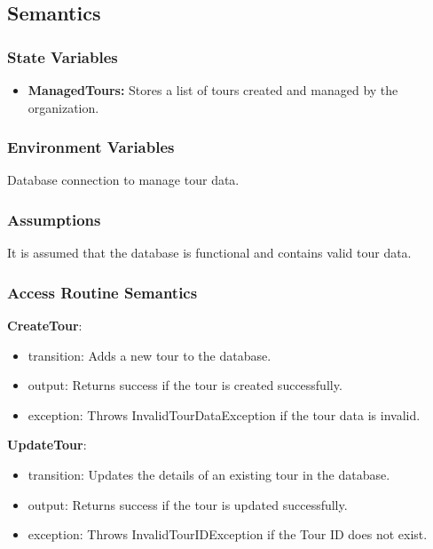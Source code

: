 \documentclass[12pt, titlepage]{article}
\begin{document}
\subsection{Semantics}

\subsubsection{State Variables}

\begin{itemize}
  \item \textbf{ManagedTours:} Stores a list of tours created and managed by the organization.
\end{itemize}

\subsubsection{Environment Variables}

Database connection to manage tour data.

\subsubsection{Assumptions}

It is assumed that the database is functional and contains valid tour data.

\subsubsection{Access Routine Semantics}

\noindent \textbf{CreateTour}:
\begin{itemize}
  \item transition: Adds a new tour to the database.
  \item output: Returns success if the tour is created successfully.
  \item exception: Throws InvalidTourDataException if the tour data is invalid.
\end{itemize}

\noindent \textbf{UpdateTour}:
\begin{itemize}
  \item transition: Updates the details of an existing tour in the database.
  \item output: Returns success if the tour is updated successfully.
  \item exception: Throws InvalidTourIDException if the Tour ID does not exist.
\end{itemize}
\end{document}
